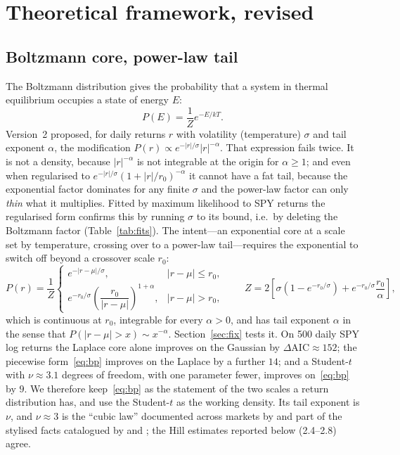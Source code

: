 \documentclass[11pt]{article}
\begin{document}
\section{Theoretical framework, revised}\label{sec:theory}

\subsection{Boltzmann core, power-law tail}\label{sec:boltzmann}
The Boltzmann distribution \citep{boltzmann1872} gives the probability that a system in thermal equilibrium occupies a state of energy $E$:
\begin{equation}
P(E)=\frac{1}{Z}e^{-E/kT}. \label{eq:boltzmann}
\end{equation}
Version~2 proposed, for daily returns $r$ with volatility (temperature) $\sigma$ and tail exponent $\alpha$, the modification $P(r)\propto e^{-|r|/\sigma}|r|^{-\alpha}$. That expression fails twice. It is not a density, because $|r|^{-\alpha}$ is not integrable at the origin for $\alpha\ge1$; and even when regularised to $e^{-|r|/\sigma}(1+|r|/r_0)^{-\alpha}$ it cannot have a fat tail, because the exponential factor dominates for any finite $\sigma$ and the power-law factor can only \emph{thin} what it multiplies. Fitted by maximum likelihood to SPY returns the regularised form confirms this by running $\sigma$ to its bound, i.e.\ by deleting the Boltzmann factor (Table~\ref{tab:fits}). The intent---an exponential core at a scale set by temperature, crossing over to a power-law tail---requires the exponential to switch off beyond a crossover scale $r_0$:
\begin{equation}
P(r)=\frac{1}{Z}\begin{cases} e^{-|r-\mu|/\sigma}, & |r-\mu|\le r_0,\\[2pt] e^{-r_0/\sigma}\left(\dfrac{r_0}{|r-\mu|}\right)^{1+\alpha}, & |r-\mu|>r_0,\end{cases}\qquad Z=2\left[\sigma\left(1-e^{-r_0/\sigma}\right)+e^{-r_0/\sigma}\frac{r_0}{\alpha}\right], \label{eq:bp}
\end{equation}
which is continuous at $r_0$, integrable for every $\alpha>0$, and has tail exponent $\alpha$ in the sense that $P(|r-\mu|>x)\sim x^{-\alpha}$. Section~\ref{sec:fix} tests it. On 500 daily SPY log returns the Laplace core alone improves on the Gaussian by $\Delta\mathrm{AIC}\approx152$; the piecewise form~\eqref{eq:bp} improves on the Laplace by a further $14$; and a Student-$t$ with $\nu\approx3.1$ degrees of freedom, with one parameter fewer, improves on~\eqref{eq:bp} by $9$. We therefore keep~\eqref{eq:bp} as the statement of the two scales a return distribution has, and use the Student-$t$ as the working density. Its tail exponent is $\nu$, and $\nu\approx3$ is the ``cubic law'' documented across markets by \citet{gabaix2003} and part of the stylised facts catalogued by \citet{mandelbrot1963} and \citet{cont2001}; the Hill estimates reported below (2.4--2.8) agree.
\end{document}
